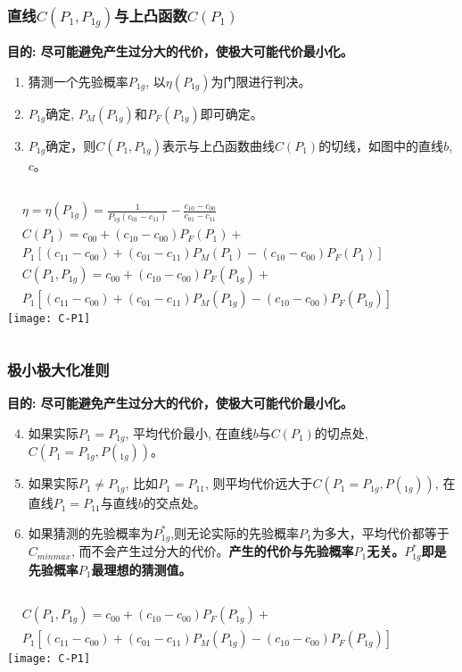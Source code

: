 \begin{frame}[shrink]
\frametitle{直线$C(P_1,P_{1g})$与上凸函数$C(P_1)$}
\textbf{目的: 尽可能避免产生过分大的代价，使极大可能代价最小化。}
\begin{enumerate}
	\item 猜测一个先验概率$P_{1g}$, 以$\eta(P_{1g})$为门限进行判决。
	\item $P_{1g}$确定, $P_M(P_{1g})$和$P_F(P_{1g})$即可确定。
	\item $P_{1g}$确定，则$C(P_1,P_{1g})$表示与上凸函数曲线$C(P_1)$的切线，如图中的直线$b$, $c$。
\end{enumerate}
\begin{columns}
	\begin{align*}
	&\eta=\eta(P_{1g})=\frac{1}{P_{1g}(c_{01}-c_{11})}-\frac{c_{10}-c_{00}}{c_{01}-c_{11}}\\
	&C(P_1)=c_{00}+(c_{10}-c_{00})P_F(P_1)+\\
	&P_1[(c_{11}-c_{00})+(c_{01}-c_{11})P_M(P_1)-(c_{10}-c_{00})P_F(P_1)]\\
	&C(P_1,P_{1g})=c_{00}+(c_{10}-c_{00})P_F(P_{1g})+\\
	&P_1[(c_{11}-c_{00})+(c_{01}-c_{11})P_M(P_{1g})-(c_{10}-c_{00})P_F(P_{1g})]
	\end{align*}
	\texttt{[image: C-P1]}
\end{columns}
\end{frame}

\begin{frame}[shrink]
\frametitle{极小极大化准则}
\textbf{目的: 尽可能避免产生过分大的代价，使极大可能代价最小化。}
\begin{enumerate}
	\setcounter{enumi}{3}
	\item 如果实际$P_1=P_{1g}$, 平均代价最小, 在直线$b$与$C(P_1)$的切点处, $C(P_1=P_{1g},P(_{1g}))$。
	\item 如果实际$P_1\ne P_{1g}$, 比如$P_1=P_{11}$, 则平均代价远大于$C(P_1=P_{1g},P(_{1g}))$, 在直线$P_1=P_{11}$与直线$b$的交点处。
	\item 如果猜测的先验概率为$P_{1g}^{\ast}$,则无论实际的先验概率$P_1$为多大，平均代价都等于$C_{minmax}$, 而不会产生过分大的代价。\textbf{产生的代价与先验概率$P_1$无关。$P_{1g}^{\ast}$即是先验概率$P_1$最理想的猜测值。}
\end{enumerate}
\begin{columns}
	\begin{align*}
	&C(P_1,P_{1g})=c_{00}+(c_{10}-c_{00})P_F(P_{1g})+\\
	&P_1[(c_{11}-c_{00})+(c_{01}-c_{11})P_M(P_{1g})-(c_{10}-c_{00})P_F(P_{1g})]
	\end{align*}
	\texttt{[image: C-P1]}
\end{columns}
\end{frame}

